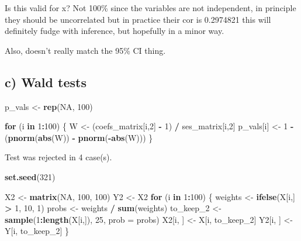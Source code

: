 \documentclass[]{article}
\newenvironment{Shaded}{\begin{snugshade}}{\end{snugshade}}
\newcommand{\ControlFlowTok}[1]{\textcolor[rgb]{0.13,0.29,0.53}{\textbf{#1}}}
\newcommand{\DataTypeTok}[1]{\textcolor[rgb]{0.13,0.29,0.53}{#1}}
\newcommand{\DecValTok}[1]{\textcolor[rgb]{0.00,0.00,0.81}{#1}}
\newcommand{\KeywordTok}[1]{\textcolor[rgb]{0.13,0.29,0.53}{\textbf{#1}}}
\newcommand{\NormalTok}[1]{#1}
\newcommand{\OperatorTok}[1]{\textcolor[rgb]{0.81,0.36,0.00}{\textbf{#1}}}
\newcommand{\OtherTok}[1]{\textcolor[rgb]{0.56,0.35,0.01}{#1}}
\newcommand{\StringTok}[1]{\textcolor[rgb]{0.31,0.60,0.02}{#1}}
\begin{document}
Is this valid for x? Not 100\% since the variables are not independent,
in principle they should be uncorrelated but in practice their cor is
0.2974821 this will definitely fudge with inference, but hopefully in a
minor way.

Also, doesn't really match the 95\% CI thing.

\hypertarget{c-wald-tests}{%
\subsection{c) Wald tests}\label{c-wald-tests}}

\begin{Shaded}
\begin{Highlighting}[]
\NormalTok{p_vals <-}\StringTok{ }\KeywordTok{rep}\NormalTok{(}\OtherTok{NA}\NormalTok{, }\DecValTok{100}\NormalTok{)}

\ControlFlowTok{for}\NormalTok{ (i }\ControlFlowTok{in} \DecValTok{1}\OperatorTok{:}\DecValTok{100}\NormalTok{) \{}
\NormalTok{    W <-}\StringTok{ }\NormalTok{(coefs_matrix[i,}\DecValTok{2}\NormalTok{] }\OperatorTok{-}\StringTok{ }\DecValTok{1}\NormalTok{) }\OperatorTok{/}\StringTok{ }\NormalTok{ses_matrix[i,}\DecValTok{2}\NormalTok{]}
\NormalTok{    p_vals[i] <-}\StringTok{ }\DecValTok{1} \OperatorTok{-}\StringTok{ }\NormalTok{(}\KeywordTok{pnorm}\NormalTok{(}\KeywordTok{abs}\NormalTok{(W)) }\OperatorTok{-}\StringTok{ }\KeywordTok{pnorm}\NormalTok{(}\OperatorTok{-}\KeywordTok{abs}\NormalTok{(W)))}
\NormalTok{\}}
\end{Highlighting}
\end{Shaded}

Test was rejected in 4 case(s).

\begin{Shaded}
\begin{Highlighting}[]
\KeywordTok{set.seed}\NormalTok{(}\DecValTok{321}\NormalTok{)}

\NormalTok{X2 <-}\StringTok{ }\KeywordTok{matrix}\NormalTok{(}\OtherTok{NA}\NormalTok{, }\DecValTok{100}\NormalTok{, }\DecValTok{100}\NormalTok{)}
\NormalTok{Y2 <-}\StringTok{ }\NormalTok{X2}
\ControlFlowTok{for}\NormalTok{ (i }\ControlFlowTok{in} \DecValTok{1}\OperatorTok{:}\DecValTok{100}\NormalTok{) \{}
\NormalTok{    weights <-}\StringTok{ }\KeywordTok{ifelse}\NormalTok{(X[i,] }\OperatorTok{>}\StringTok{ }\DecValTok{1}\NormalTok{, }\DecValTok{10}\NormalTok{, }\DecValTok{1}\NormalTok{)}
\NormalTok{    probs <-}\StringTok{ }\NormalTok{weights }\OperatorTok{/}\StringTok{ }\KeywordTok{sum}\NormalTok{(weights)}
\NormalTok{    to_keep_}\DecValTok{2}\NormalTok{ <-}\StringTok{ }\KeywordTok{sample}\NormalTok{(}\DecValTok{1}\OperatorTok{:}\KeywordTok{length}\NormalTok{(X[i,]), }\DecValTok{25}\NormalTok{, }\DataTypeTok{prob =}\NormalTok{ probs)}
\NormalTok{    X2[i, ] <-}\StringTok{ }\NormalTok{X[i, to_keep_}\DecValTok{2}\NormalTok{]}
\NormalTok{    Y2[i, ] <-}\StringTok{ }\NormalTok{Y[i, to_keep_}\DecValTok{2}\NormalTok{]}
\NormalTok{\}}
\end{Highlighting}
\end{Shaded}
\end{document}
